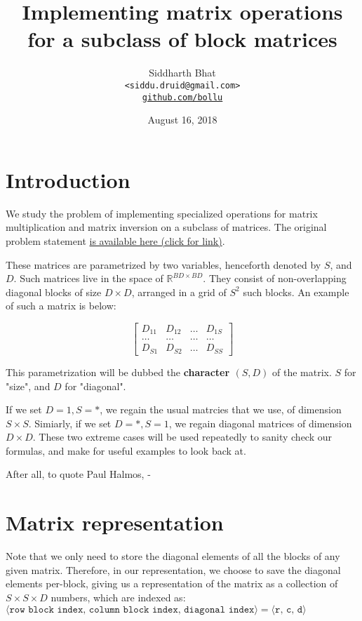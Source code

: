 \documentclass[11pt]{article}
\title{Implementing matrix operations for a subclass of block matrices}
\author{Siddharth Bhat \\ 
    \texttt{<siddu.druid@gmail.com>} \\ 
    \href{http://www.github.com/bollu}{\texttt{github.com/bollu}}
}
\date{August 16, 2018}
\begin{document}
\newcommand{\bigO}{\mathcal{O}}
\maketitle

\section{Introduction}

We study the problem of implementing specialized operations for 
matrix multiplication and matrix inversion on a subclass of matrices. The
original problem statement 
\href{http://hal.cse.msu.edu/misc/join/}{is available here (click for link)}.

These matrices are parametrized by two variables, henceforth denoted by
$S$, and $D$. Such matrices live in the space of $\mathbb{R}^{BD \times BD}$.
They consist of non-overlapping diagonal blocks of size $D \times D$, arranged
in a grid of $S^2$ such blocks. An example of such a matrix is below:

$$
\begin{bmatrix}
    D_{11} & D_{12} &\dots & D_{1S} \\
    \dots & \dots   & \dots & \dots \\
    D_{S1} & D_{S2} & \dots &  D_{SS} 
\end{bmatrix}
$$

This parametrization will be dubbed the \textbf{character $(S, D)$} of the matrix.
$S$ for "size", and $D$ for "diagonal". 

If we set $D = 1, S = *$, we regain the usual matrcies that we use, of dimension
$S \times S$. Simiarly, if we set $D = *, S = 1$, we regain diagonal matrices
of dimension $D \times D$. These two extreme cases will be used repeatedly to
sanity check our formulas, and make for useful examples to look back at. 

After all, to quote Paul Halmos, - 


\section{Matrix representation}
Note that we only need to store the diagonal elements of all the blocks of any
given matrix. Therefore, in our representation, we choose to save the diagonal
elements per-block, giving us a representation of the matrix as a collection of
$S \times S \times D$ numbers, which are indexed as:
$\langle\texttt{row block index, column block index, diagonal index} \rangle = \langle \texttt{r, c, d} \rangle$
\end{document}
